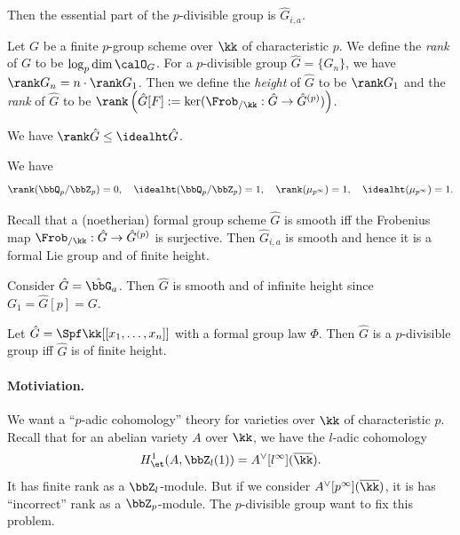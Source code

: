 Then the essential part of the $p$-divisible group is $\hat{G}_{i,a}$.

\begin{definition}
	Let $G$ be a finite $p$-group scheme over $\kk$ of characteristic $p$.
	We define the \emph{rank} of $G$ to be $\log_p \dim \calO_G$.
	For a $p$-divisible group $\hat{G} = \{G_n\}$, we have $\rank G_n = n \cdot \rank G_1$.
	Then we define the \emph{height} of $\hat{G}$ to be $\rank G_1$ and the \emph{rank} of $\hat{G}$ to be $\rank \left( \hat{G}[F] := \ker(\Frob_{/\kk}: \hat{G} \to \hat{G}^{(p)}) \right)$.
\end{definition}

We have $\rank \hat{G} \leq \idealht \hat{G}$.

\begin{example}
	We have
	\[ \rank(\bbQ_p/\bbZ_p) = 0, \quad \idealht(\bbQ_p/\bbZ_p) = 1, \quad \rank(\mu_{p^\infty}) = 1, \quad \idealht(\mu_{p^\infty}) = 1. \]
\end{example}

Recall that a (noetherian) formal group scheme $\hat{G}$ is smooth iff the Frobenius map $\Frob_{/\kk}: \hat{G} \to \hat{G}^{(p)}$ is surjective.
Then $\hat{G}_{i,a}$ is smooth and hence it is a formal Lie group and of finite height.

\begin{example}
	Consider $\hat{G} = \hat{\bbG}_a$.
	Then $\hat{G}$ is smooth and of infinite height since $G_1 = \hat{G}[p] = G$.
\end{example}

\begin{proposition}
	Let $\hat{G} = \Spf \kk[[x_1, \ldots, x_n]]$ with a formal group law $\Phi$.
	Then $\hat{G}$ is a $p$-divisible group iff $\hat{G}$ is of finite height.
\end{proposition}

\paragraph{Motiviation.}
We want a ``$p$-adic cohomology'' theory for varieties over $\kk$ of characteristic $p$.
Recall that for an abelian variety $A$ over $\kk$, we have the $l$-adic cohomology
\[ H^1_{\et}(A, \bbZ_l(1)) = A^\vee[l^\infty](\overline{\kk}). \]
It has finite rank as a $\bbZ_l$-module.
But if we consider $A^\vee[p^\infty](\overline{\kk})$, it is has ``incorrect'' rank as a $\bbZ_p$-module.
The $p$-divisible group want to fix this problem.



